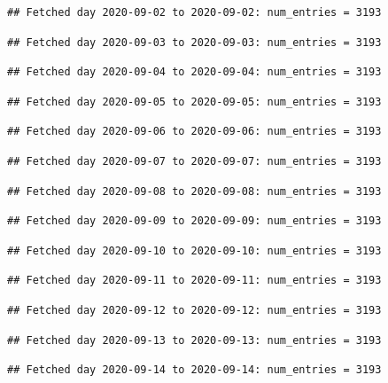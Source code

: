 \documentclass[]{article}
\begin{document}
\begin{verbatim}
## Fetched day 2020-09-02 to 2020-09-02: num_entries = 3193
\end{verbatim}

\begin{verbatim}
## Fetched day 2020-09-03 to 2020-09-03: num_entries = 3193
\end{verbatim}

\begin{verbatim}
## Fetched day 2020-09-04 to 2020-09-04: num_entries = 3193
\end{verbatim}

\begin{verbatim}
## Fetched day 2020-09-05 to 2020-09-05: num_entries = 3193
\end{verbatim}

\begin{verbatim}
## Fetched day 2020-09-06 to 2020-09-06: num_entries = 3193
\end{verbatim}

\begin{verbatim}
## Fetched day 2020-09-07 to 2020-09-07: num_entries = 3193
\end{verbatim}

\begin{verbatim}
## Fetched day 2020-09-08 to 2020-09-08: num_entries = 3193
\end{verbatim}

\begin{verbatim}
## Fetched day 2020-09-09 to 2020-09-09: num_entries = 3193
\end{verbatim}

\begin{verbatim}
## Fetched day 2020-09-10 to 2020-09-10: num_entries = 3193
\end{verbatim}

\begin{verbatim}
## Fetched day 2020-09-11 to 2020-09-11: num_entries = 3193
\end{verbatim}

\begin{verbatim}
## Fetched day 2020-09-12 to 2020-09-12: num_entries = 3193
\end{verbatim}

\begin{verbatim}
## Fetched day 2020-09-13 to 2020-09-13: num_entries = 3193
\end{verbatim}

\begin{verbatim}
## Fetched day 2020-09-14 to 2020-09-14: num_entries = 3193
\end{verbatim}
\end{document}
